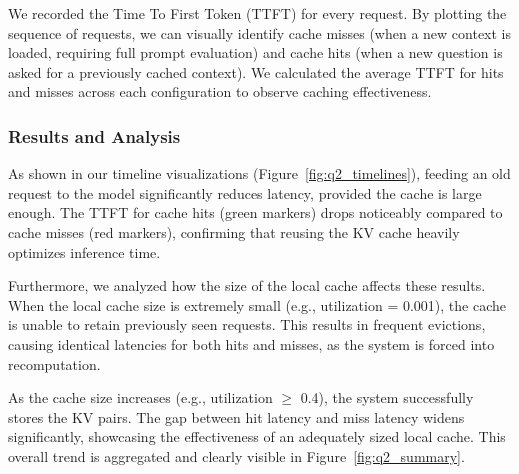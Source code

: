 \documentclass[a4paper, 11pt]{article}
\begin{document}
We recorded the Time To First Token (TTFT) for every request. By plotting the sequence of requests, we can visually identify cache misses (when a new context is loaded, requiring full prompt evaluation) and cache hits (when a new question is asked for a previously cached context). We calculated the average TTFT for hits and misses across each configuration to observe caching effectiveness.

\subsubsection*{Results and Analysis}
As shown in our timeline visualizations (Figure~\ref{fig:q2_timelines}), feeding an old request to the model significantly reduces latency, provided the cache is large enough. The TTFT for cache hits (green markers) drops noticeably compared to cache misses (red markers), confirming that reusing the KV cache heavily optimizes inference time.

Furthermore, we analyzed how the size of the local cache affects these results. When the local cache size is extremely small (e.g., utilization = 0.001), the cache is unable to retain previously seen requests. This results in frequent evictions, causing identical latencies for both hits and misses, as the system is forced into recomputation. 

As the cache size increases (e.g., utilization $\ge$ 0.4), the system successfully stores the KV pairs. The gap between hit latency and miss latency widens significantly, showcasing the effectiveness of an adequately sized local cache. This overall trend is aggregated and clearly visible in Figure~\ref{fig:q2_summary}.
\end{document}
